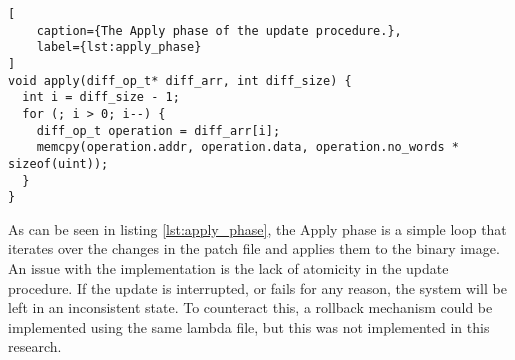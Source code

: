 \begin{lstlisting}[
    caption={The Apply phase of the update procedure.},
    label={lst:apply_phase}
]
void apply(diff_op_t* diff_arr, int diff_size) {
  int i = diff_size - 1;
  for (; i > 0; i--) {
    diff_op_t operation = diff_arr[i];
    memcpy(operation.addr, operation.data, operation.no_words * sizeof(uint));
  }
}
\end{lstlisting}

As can be seen in listing \ref{lst:apply_phase}, the Apply phase is a simple loop that iterates over the changes in the patch file and applies them to the binary image. An issue with the implementation is the lack of atomicity in the update procedure. If the update is interrupted, or fails for any reason, the system will be left in an inconsistent state. To counteract this, a rollback mechanism could be implemented using the same lambda file, but this was not implemented in this research. 
